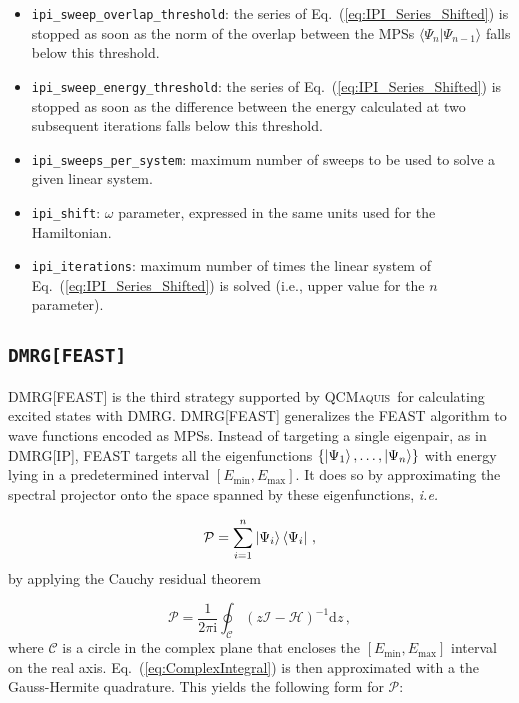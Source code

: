 \documentclass[bibliography=totoc,12pt,a4paper]{scrartcl}
\newcommand{\qcm}{\textsc{QCMaquis}}
\begin{document}
\begin{itemize}
  \item \texttt{ipi\_sweep\_overlap\_threshold}: the series of Eq.~(\ref{eq:IPI_Series_Shifted}) is stopped as soon as the norm of the overlap between the MPSs $\langle \Psi_n | \Psi_{n-1} \rangle$ falls below this threshold.
  \item \texttt{ipi\_sweep\_energy\_threshold}: the series of Eq.~(\ref{eq:IPI_Series_Shifted}) is stopped as soon as the difference between the energy calculated at two subsequent iterations falls below this threshold.
  \item \texttt{ipi\_sweeps\_per\_system}: maximum number of sweeps to be used to solve a given linear system.
  \item \texttt{ipi\_shift}: $\omega$ parameter, expressed in the same units used for the Hamiltonian.
  \item \texttt{ipi\_iterations}: maximum number of times the linear system of Eq.~(\ref{eq:IPI_Series_Shifted}) is solved (i.e., upper value for the $n$ parameter).
\end{itemize}

\subsection{\texttt{DMRG[FEAST]}}
\label{subsec:FEAST}

DMRG[FEAST] is the third strategy supported by \qcm\ for calculating excited states with DMRG.
DMRG[FEAST]\cite{Baiardi2022_DMRG-FEAST} generalizes the FEAST algorithm\cite{Polizzi2009_FEAST} to wave functions encoded as MPSs.
Instead of targeting a single eigenpair, as in DMRG[IP], FEAST targets all the eigenfunctions $\left\{ \ket{\Psi_1}, \ldots, \ket{\Psi_n} \right\}$ with energy lying in a predetermined interval $\left[ E_\text{min}, E_\text{max} \right]$.
It does so by approximating the spectral projector onto the space spanned by these eigenfunctions, \textit{i.e.}

\begin{equation}
  \mathcal{P} = \sum_{i=1}^n \ket{\Psi_i} \bra{\Psi_i} \, ,
  \label{eq:SpectralProjector}
\end{equation}
%
by applying the Cauchy residual theorem

\begin{equation}
  \mathcal{P}  = \frac{1}{2\pi\mathrm{i}} \oint_{\mathcal{C}} 
	\left( z \mathcal{I} - \mathcal{H} \right)^{-1} \mathrm{d}z \, ,
  \label{eq:ComplexIntegral}
\end{equation}
%
where $\mathcal{C}$ is a circle in the complex plane that encloses the $\left[ E_\text{min}, E_\text{max} \right]$ interval on the real axis. 
Eq.~(\ref{eq:ComplexIntegral}) is then approximated with a the Gauss-Hermite quadrature.
This yields the following form for $\mathcal{P}$:
\end{document}
